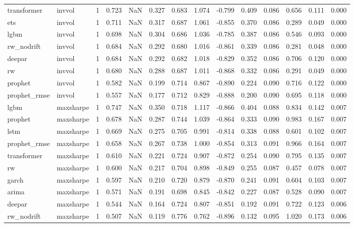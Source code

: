 \begin{table}
\begin{tabular}{llrrrrrrrrrrrr}
transformer & invvol & 1 & 0.723 & NaN & 0.327 & 0.683 & 1.074 & -0.799 & 0.409 & 0.086 & 0.656 & 0.111 & 0.000 \\
ets & invvol & 1 & 0.711 & NaN & 0.317 & 0.687 & 1.061 & -0.855 & 0.370 & 0.086 & 0.289 & 0.049 & 0.000 \\
lgbm & invvol & 1 & 0.698 & NaN & 0.304 & 0.686 & 1.036 & -0.785 & 0.387 & 0.086 & 0.546 & 0.093 & 0.000 \\
rw\_nodrift & invvol & 1 & 0.684 & NaN & 0.292 & 0.680 & 1.016 & -0.861 & 0.339 & 0.086 & 0.281 & 0.048 & 0.000 \\
deepar & invvol & 1 & 0.684 & NaN & 0.292 & 0.682 & 1.018 & -0.829 & 0.352 & 0.086 & 0.706 & 0.120 & 0.000 \\
rw & invvol & 1 & 0.680 & NaN & 0.288 & 0.687 & 1.011 & -0.868 & 0.332 & 0.086 & 0.291 & 0.049 & 0.000 \\
prophet & invvol & 1 & 0.582 & NaN & 0.199 & 0.714 & 0.867 & -0.890 & 0.224 & 0.090 & 0.716 & 0.122 & 0.000 \\
prophet\_rmse & invvol & 1 & 0.557 & NaN & 0.177 & 0.712 & 0.829 & -0.888 & 0.200 & 0.090 & 0.695 & 0.118 & 0.000 \\
lgbm & maxsharpe & 1 & 0.747 & NaN & 0.350 & 0.718 & 1.117 & -0.866 & 0.404 & 0.088 & 0.834 & 0.142 & 0.007 \\
prophet & maxsharpe & 1 & 0.678 & NaN & 0.287 & 0.744 & 1.039 & -0.864 & 0.333 & 0.090 & 0.983 & 0.167 & 0.007 \\
lstm & maxsharpe & 1 & 0.669 & NaN & 0.275 & 0.705 & 0.991 & -0.814 & 0.338 & 0.088 & 0.601 & 0.102 & 0.007 \\
prophet\_rmse & maxsharpe & 1 & 0.658 & NaN & 0.267 & 0.738 & 1.000 & -0.854 & 0.313 & 0.091 & 0.966 & 0.164 & 0.007 \\
transformer & maxsharpe & 1 & 0.610 & NaN & 0.221 & 0.724 & 0.907 & -0.872 & 0.254 & 0.090 & 0.795 & 0.135 & 0.007 \\
rw & maxsharpe & 1 & 0.600 & NaN & 0.217 & 0.704 & 0.898 & -0.849 & 0.255 & 0.087 & 0.457 & 0.078 & 0.007 \\
garch & maxsharpe & 1 & 0.597 & NaN & 0.210 & 0.720 & 0.879 & -0.870 & 0.241 & 0.091 & 0.604 & 0.103 & 0.007 \\
arima & maxsharpe & 1 & 0.571 & NaN & 0.191 & 0.698 & 0.845 & -0.842 & 0.227 & 0.087 & 0.528 & 0.090 & 0.007 \\
deepar & maxsharpe & 1 & 0.544 & NaN & 0.164 & 0.724 & 0.807 & -0.851 & 0.192 & 0.091 & 0.722 & 0.123 & 0.006 \\
rw\_nodrift & maxsharpe & 1 & 0.507 & NaN & 0.119 & 0.776 & 0.762 & -0.896 & 0.132 & 0.095 & 1.020 & 0.173 & 0.006 \\

\end{tabular}
\end{table}
